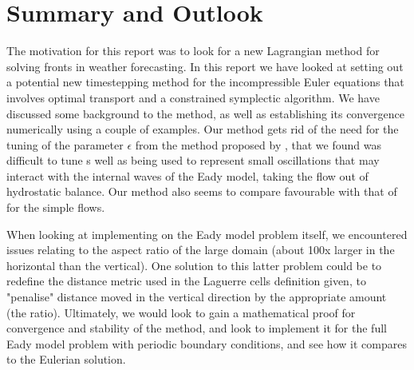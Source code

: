 \documentclass[11pt, oneside]{article}   	%
\begin{document}
\section{Summary and Outlook}

The motivation for this report was to look for a new Lagrangian method for solving fronts in weather forecasting. In this report we have looked at setting out a potential new timestepping method for the incompressible Euler equations that involves optimal transport and a constrained symplectic algorithm. We have discussed some background to the method, as well as establishing its convergence numerically using a couple of examples. Our method gets rid of the need for the tuning of the parameter \(\epsilon\) from the method proposed by \cite{gallouet2016lagrangian}, that we found was difficult to tune s well as being used to represent small oscillations that may interact with the internal waves of the Eady model, taking the flow out of hydrostatic balance. Our method also seems to compare favourable with that of \cite{gallouet2016lagrangian} for the simple flows. 

When looking at implementing on the Eady model problem itself, we encountered issues relating to the aspect ratio of the large domain (about 100x larger in the horizontal than the vertical). One solution to this latter problem could be to redefine the distance metric used in the Laguerre cells definition given, to "penalise" distance moved in the vertical direction by the appropriate amount (the ratio). Ultimately, we would look to gain a mathematical proof for convergence and stability of the method, and look to implement it for the full Eady model problem with periodic boundary conditions, and see how it compares to the Eulerian solution.



\end{document}
